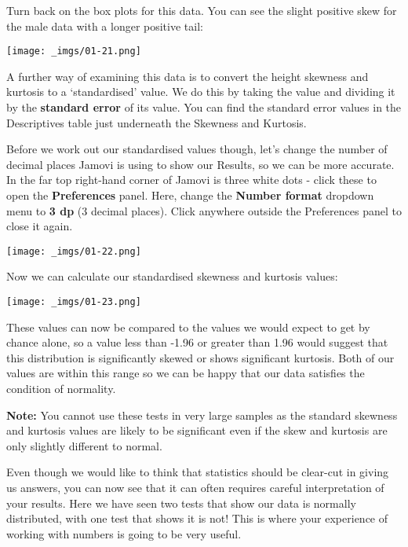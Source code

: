 \documentclass[
  letterpaper,
  DIV=11,
  numbers=noendperiod]{scrartcl}
\begin{document}
Turn back on the box plots for this data. You can see the slight
positive skew for the male data with a longer positive tail:

\texttt{[image: \_imgs/01-21.png]}

A further way of examining this data is to convert the height skewness
and kurtosis to a `standardised' value. We do this by taking the value
and dividing it by the \textbf{standard error} of its value. You can
find the standard error values in the Descriptives table just underneath
the Skewness and Kurtosis.

Before we work out our standardised values though, let's change the
number of decimal places Jamovi is using to show our Results, so we can
be more accurate. In the far top right-hand corner of Jamovi is three
white dots - click these to open the \textbf{Preferences} panel. Here,
change the \textbf{Number format} dropdown menu to \textbf{3 dp} (3
decimal places). Click anywhere outside the Preferences panel to close
it again.

\texttt{[image: \_imgs/01-22.png]}

Now we can calculate our standardised skewness and kurtosis values:

\texttt{[image: \_imgs/01-23.png]}

These values can now be compared to the values we would expect to get by
chance alone, so a value less than -1.96 or greater than 1.96 would
suggest that this distribution is significantly skewed or shows
significant kurtosis. Both of our values are within this range so we can
be happy that our data satisfies the condition of normality.

\begin{tcolorbox}[beforeafter skip=1cm, ignore nobreak=true, breakable, colframe=Aside-frame, colback=Aside-bg, coltext=Aside-text, boxsep=2mm, arc=0mm, boxrule=0.5mm]

\textbf{Note:} You cannot use these tests in very large samples as the
standard skewness and kurtosis values are likely to be significant even
if the skew and kurtosis are only slightly different to normal.

\end{tcolorbox}

Even though we would like to think that statistics should be clear-cut
in giving us answers, you can now see that it can often requires careful
interpretation of your results. Here we have seen two tests that show
our data is normally distributed, with one test that shows it is not!
This is where your experience of working with numbers is going to be
very useful.
\end{document}
